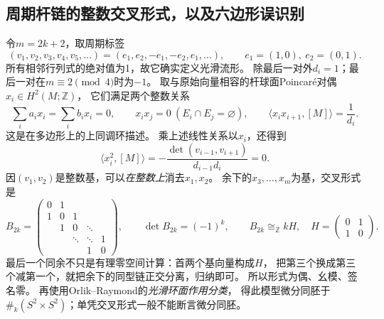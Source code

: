 \documentclass[UTF8,a4paper,11pt,fontset=fandol]{ctexart}
\numberwithin{equation}{section}
\theoremstyle{definition}
\newcommand{\Z}{\mathbb Z}
\begin{document}
\subsection{周期杆链的整数交叉形式，以及六边形误识别}
令$m=2k+2$，取周期标签
\begin{equation}\label{eq:toric-periodic-labels}
 (v_1,v_2,v_3,v_4,v_5,\ldots)
 =(e_1,e_2,-e_1,-e_2,e_1,\ldots),\qquad
 e_1=(1,0),\ e_2=(0,1).
\end{equation}
所有相邻行列式的绝对值为1，故它确实定义光滑流形。
除最后一对外$d_i=1$；最后一对在$m\equiv2\pmod4$时为$-1$。
取与原始向量相容的杆球面Poincar\'e对偶$x_i\in H^2(M;\Z)$，
它们满足两个整数关系
\begin{equation}\label{eq:toric-divisor-relations}
 \sum_i a_i x_i=\sum_i b_i x_i=0,\qquad
 x_ix_j=0\ (E_i\cap E_j=\varnothing),\qquad
 \langle x_ix_{i+1},[M]\rangle=\frac1{d_i}.
\end{equation}
这是\cite[Theorem 4.14]{DJ1991}在多边形上的上同调环描述。
乘上述线性关系以$x_i$，还得到
\[
 \langle x_i^2,[M]\rangle
 =-\frac{\det(v_{i-1},v_{i+1})}{d_{i-1}d_i}=0.
\]
因$(v_1,v_2)$是整数基，可以\emph{在整数上}消去$x_1,x_2$。
余下的$x_3,\ldots,x_m$为基，交叉形式是
\begin{equation}\label{eq:toric-integral-chain}
 B_{2k}=\begin{pmatrix}
 0&1&&&\\1&0&1&&\\&1&0&\ddots&\\&&\ddots&\ddots&1\\&&&1&0
 \end{pmatrix},\qquad
 \det B_{2k}=(-1)^k,\qquad B_{2k}\cong_\Z kH,\quad
 H=\begin{pmatrix}0&1\\1&0\end{pmatrix}.
\end{equation}
最后一个同余不只是有理零空间计算：首两个基向量构成$H$，
把第三个换成第三个减第一个，就把余下的同型链正交分离，归纳即可。
所以形式为偶、幺模、签名零。
再使用Orlik--Raymond的\emph{光滑环面作用分类}\cite[\S5]{OrlikRaymond}，
得此模型微分同胚于$\#_k(S^2\times S^2)$；单凭交叉形式一般不能断言微分同胚。
\end{document}
